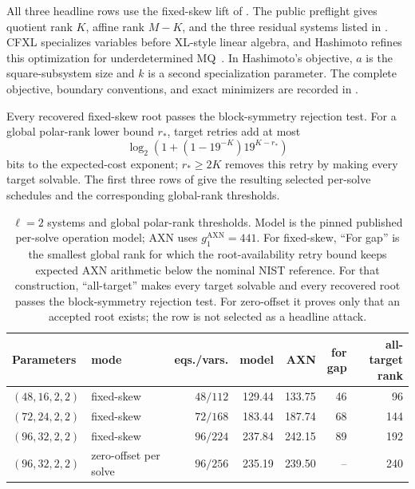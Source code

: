 \documentclass[11pt]{article}
\newcommand{\rank}{\operatorname{rank}}
\begin{document}
All three headline rows use the fixed-skew lift of
.  The public preflight gives quotient rank $K$, affine
rank $M-K$, and the three residual systems listed in
.  CFXL specializes variables before XL-style linear
algebra, and Hashimoto refines this optimization for underdetermined
MQ~\cite{Beullens2024SNOVA,Hashimoto2023}.  In Hashimoto's objective, $a$ is
the square-subsystem size and $k$ is a second specialization parameter.  The
complete objective, boundary conventions, and exact minimizers are recorded
in .

Every recovered fixed-skew root passes the block-symmetry rejection test.  For
a global polar-rank lower bound $r_*$, target retries add at most
\[
 \log_2\!\left(1+(1-19^{-K})19^{K-r_*}\right)
\]
bits to the expected-cost exponent; $r_*\ge2K$ removes this retry by making
every target solvable.  The first three rows of  give the
resulting selected per-solve schedules and the corresponding global-rank
thresholds.

\begin{table}[tbp]
\centering
\caption{$\ell=2$ systems and global polar-rank thresholds.  Model is the
pinned published per-solve operation model; AXN uses
$g_1^{\mathrm{AXN}}=441$.  For fixed-skew, ``For gap'' is the smallest global
rank for which the root-availability retry bound keeps expected AXN arithmetic
below the nominal NIST reference.  For that construction,
``all-target'' makes every target solvable and every recovered root passes the
block-symmetry rejection test.  For zero-offset it proves only that an accepted root
exists; the row is not selected as a headline attack.}
\label{tab:l2-costs}
\scriptsize
\setlength{\tabcolsep}{3.25pt}
\begin{tabular}{@{}l l r r r r r@{}}
\toprule
Parameters & mode & eqs./vars. & model & AXN & \shortstack{for\\gap} & \shortstack{all-target\\rank}\\
\midrule
$(48,16,2,2)$ & fixed-skew & $48/112$ & 129.44 & 133.75 & 46  & 96\\
$(72,24,2,2)$ & fixed-skew & $72/168$ & 183.44 & 187.74 & 68  & 144\\
$(96,32,2,2)$ & fixed-skew & $96/224$ & 237.84 & 242.15 & 89  & 192\\
$(96,32,2,2)$ & zero-offset per solve & $96/256$ & 235.19 & 239.50 & -- & 240\\
\bottomrule
\end{tabular}
\end{table}
\end{document}
